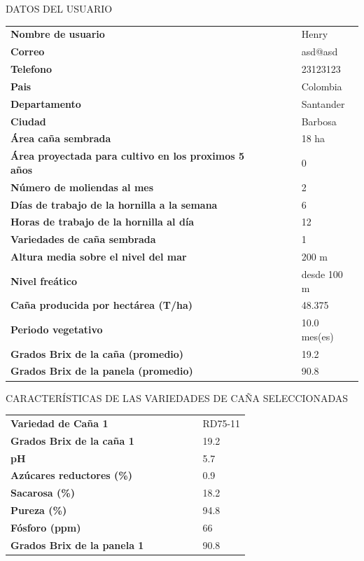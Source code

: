 \documentclass{article}%
\begin{document}
\newpage%
\begin{center}%
\begin{Huge}%
DATOS DEL USUARIO%
\end{Huge}%
\linebreak%
\end{center}%
\begin{tabular}{lccccl}%
\textbf{Nombre de usuario}& & & & &Henry\\%
\textbf{Correo}& & & & &asd@asd\\%
\textbf{Telefono}& & & & &23123123\\%
\textbf{Pais}& & & & &Colombia\\%
\textbf{Departamento}& & & & &Santander\\%
\textbf{Ciudad}& & & & &Barbosa\\%
\textbf{Área caña sembrada}& & & & &18 ha\\%
\textbf{Área proyectada para cultivo en los proximos 5 años}& & & & &0\\%
\textbf{Número de moliendas al mes}& & & & &2\\%
\textbf{Días de trabajo de la hornilla a la semana}& & & & &6\\%
\textbf{Horas de trabajo de la hornilla al día}& & & & &12\\%
\textbf{Variedades de caña sembrada}& & & & &1\\%
\textbf{Altura media sobre el nivel del mar}& & & & &200 m\\%
\textbf{Nivel freático}& & & & &desde 100 m\\%
\textbf{Caña producida por hectárea (T/ha)}& & & & &48.375\\%
\textbf{Periodo vegetativo}& & & & &10.0 mes(es)\\%
\textbf{Grados Brix de la caña (promedio)}& & & & &19.2\\%
\textbf{Grados Brix de la panela (promedio)}& & & & &90.8\\%
\end{tabular}%
\newpage%
\begin{center}%
\begin{Huge}%
CARACTERÍSTICAS DE LAS VARIEDADES DE CAÑA SELECCIONADAS%
\end{Huge}%
\linebreak%
\end{center}%
\begin{tabular}{lcccccl}%
\textbf{Variedad de Caña 1}& & & & & &RD75{-}11\\%
\textbf{Grados Brix de la caña 1}& & & & & &19.2\\%
\textbf{pH}& & & & & &5.7\\%
\textbf{Azúcares reductores (\%)}& & & & & &0.9\\%
\textbf{Sacarosa (\%)}& & & & & &18.2\\%
\textbf{Pureza (\%)}& & & & & &94.8\\%
\textbf{Fósforo (ppm)}& & & & & &66\\%
\textbf{Grados Brix de la panela 1}& & & & & &90.8\\%
\end{tabular}%
\linebreak%
\newline%
%
\linebreak%
\end{document}
